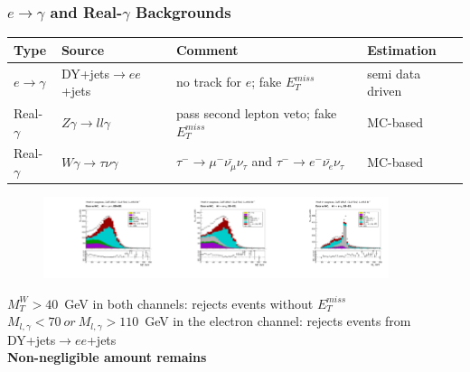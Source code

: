 \begin{frame}\frametitle {$e\rightarrow\gamma$ and Real-$\gamma$ Backgrounds}

  \begin{table}[h]
     \scriptsize
     \begin{center}
     \begin{tabular}{|l|l|l|l|}
     \hline
     Type & Source & Comment & Estimation \\ \hline
     $e\rightarrow\gamma$ & DY+jets$\rightarrow ee$+jets & no track for $e$; fake $E_T^{miss}$ & semi data driven\\\hline
     Real-$\gamma$ & $Z\gamma \rightarrow ll\gamma$ & pass second lepton veto; fake $E_T^{miss}$ & MC-based\\\hline
     Real-$\gamma$ & $W\gamma \rightarrow \tau\nu\gamma$ & $\tau^- \rightarrow \mu^- \bar{\nu_{\mu}} \nu_{\tau}$ and $\tau^- \rightarrow e^- \bar{\nu_{e}} \nu_{\tau}$ & MC-based\\
     \hline
      \end{tabular}
      \end{center}
  \end{table}

\begin{figure}[htb]
  \begin{center}
   \includegraphics[width=0.30\textwidth]{../figs/figs_v11/MUON_WGamma/PrepareYields/c_TotalDATAvsMC_EtaCommon__WMtVERY_PRELIMINARY.pdf}\includegraphics[width=0.30\textwidth]{../figs/figs_v11/ELECTRON_WGamma/PrepareYields/c_TotalDATAvsMC_EtaCommon__WMtVERY_PRELIMINARY.pdf}\includegraphics[width=0.30\textwidth]{../figs/figs_v11/ELECTRON_WGamma/PrepareYields/c_TotalDATAvsMC_EtaCommon__Mpholep1PRELIMINARY_FOR_E_TO_GAMMA_WITH_PSV_CUT.pdf}
  \end{center}
\end{figure}
\tiny
$M_T^W>40$~GeV in both channels: rejects events without $E_T^{miss}$\\
$M_{l,\gamma}<70~or~M_{l,\gamma}>110$~GeV in the electron channel: rejects events from DY+jets$\rightarrow ee$+jets \\
{\bfseries{Non-negligible amount remains}}\\


\end{frame}

